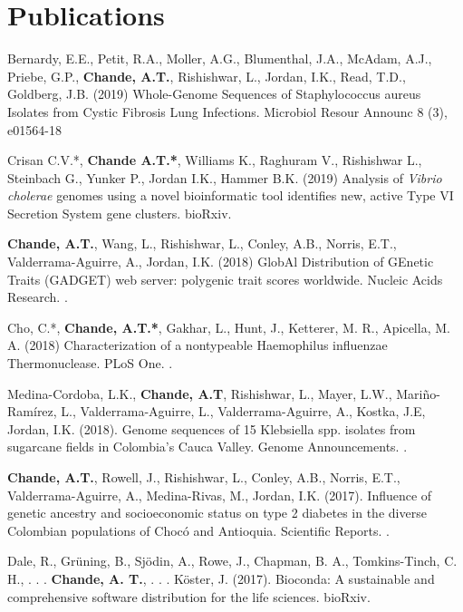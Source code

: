\documentclass[11pt,letterpaper,sans]{moderncv} %
\begin{document}
\section{Publications}

\begin{etaremune}
\item Bernardy, E.E., Petit, R.A., Moller, A.G., Blumenthal, J.A., McAdam, A.J., Priebe, G.P., \textbf{Chande, A.T.}, Rishishwar, L., Jordan, I.K., Read, T.D.,  Goldberg, J.B. (2019) Whole-Genome Sequences of Staphylococcus aureus Isolates from Cystic Fibrosis Lung Infections. Microbiol Resour Announc 8 (3), e01564-18  
\item Crisan C.V.*, \textbf{Chande A.T.*}, Williams K., Raghuram V., Rishishwar L., Steinbach G., Yunker P., Jordan I.K., Hammer B.K. (2019) Analysis of \textit{Vibrio cholerae} genomes using a novel bioinformatic tool identifies new, active Type VI Secretion System gene clusters. bioRxiv. 
\item \textbf{Chande, A.T.}, Wang, L., Rishishwar, L., Conley, A.B., Norris, E.T., Valderrama-Aguirre, A., Jordan, I.K. (2018) GlobAl Distribution of GEnetic Traits (GADGET) web server: polygenic trait scores worldwide. Nucleic Acids Research. . 
\item Cho, C.*, \textbf{Chande, A.T.*}, Gakhar, L., Hunt, J., Ketterer, M. R., Apicella, M. A. (2018) Characterization of a nontypeable Haemophilus influenzae Thermonuclease. PLoS One. . 
\item Medina-Cordoba, L.K., \textbf{Chande, A.T}, Rishishwar, L., Mayer, L.W., Mari{\~{n}}o-Ram{{\'i}}rez, L., Valderrama-Aguirre, L., Valderrama-Aguirre, A., Kostka, J.E, Jordan, I.K. (2018). Genome sequences of 15 Klebsiella spp. isolates from sugarcane fields in Colombia's Cauca Valley. Genome Announcements. . 
\item \textbf{Chande, A.T.}, Rowell, J., Rishishwar, L., Conley, A.B., Norris, E.T., Valderrama-Aguirre, A., Medina-Rivas, M., Jordan, I.K. (2017). Influence of genetic ancestry and socioeconomic status on type 2 diabetes in the diverse Colombian populations of Choc\'{o} and Antioquia. Scientific Reports. . 
\item Dale, R., Gr{\"u}ning, B., Sj{\"o}din, A., Rowe, J., Chapman, B. A., Tomkins-Tinch, C. H., . . . \textbf{Chande, A. T.}, . . . K{\"o}ster, J. (2017). Bioconda: A sustainable and comprehensive software distribution for the life sciences. bioRxiv. 

\end{etaremune}
\end{document}
